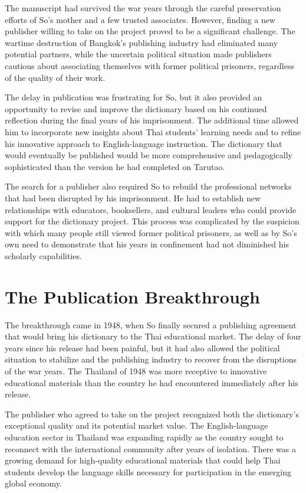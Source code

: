 \documentclass[
  Letterpaper,
]{scrbook}
\begin{document}
The manuscript had survived the war years through the careful
preservation efforts of So's mother and a few trusted associates.
However, finding a new publisher willing to take on the project proved
to be a significant challenge. The wartime destruction of Bangkok's
publishing industry had eliminated many potential partners, while the
uncertain political situation made publishers cautious about associating
themselves with former political prisoners, regardless of the quality of
their work.

The delay in publication was frustrating for So, but it also provided an
opportunity to revise and improve the dictionary based on his continued
reflection during the final years of his imprisonment. The additional
time allowed him to incorporate new insights about Thai students'
learning needs and to refine his innovative approach to English-language
instruction. The dictionary that would eventually be published would be
more comprehensive and pedagogically sophisticated than the version he
had completed on Tarutao.

The search for a publisher also required So to rebuild the professional
networks that had been disrupted by his imprisonment. He had to
establish new relationships with educators, booksellers, and cultural
leaders who could provide support for the dictionary project. This
process was complicated by the suspicion with which many people still
viewed former political prisoners, as well as by So's own need to
demonstrate that his years in confinement had not diminished his
scholarly capabilities.

\section{The Publication
Breakthrough}\label{the-publication-breakthrough}

The breakthrough came in 1948, when So finally secured a publishing
agreement that would bring his dictionary to the Thai educational
market. The delay of four years since his release had been painful, but
it had also allowed the political situation to stabilize and the
publishing industry to recover from the disruptions of the war years.
The Thailand of 1948 was more receptive to innovative educational
materials than the country he had encountered immediately after his
release.

The publisher who agreed to take on the project recognized both the
dictionary's exceptional quality and its potential market value. The
English-language education sector in Thailand was expanding rapidly as
the country sought to reconnect with the international community after
years of isolation. There was a growing demand for high-quality
educational materials that could help Thai students develop the language
skills necessary for participation in the emerging global economy.
\end{document}
